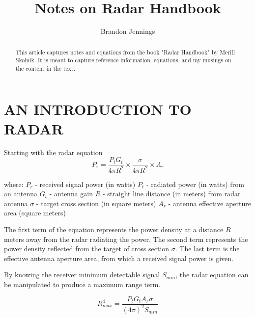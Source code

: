 \documentclass[]{article}
\title{Notes on Radar Handbook}
\author{Brandon Jennings}
\begin{document}
\maketitle

\begin{abstract}
This article captures notes and equations from the book "Radar Handbook" by Merill Skolnik. It is meant to capture reference information, equations, and my musings on the content in the text.
\end{abstract}

\section{AN INTRODUCTION TO RADAR}

Starting with the radar equation
\begin{equation}
P_{r} = \frac{P_{t}G_{t}}{4\pi R^{2}} \times \frac{\sigma}{4\pi R^{2}} \times A_{r}
\end{equation}

\noindent where: \newline
$P_{r}$ - received signal power (in watts) \newline
$P_{t}$ - radiated power (in watts) from an antenna \newline
$G_{t}$ - antenna gain \newline
$R$ - straight line distance (in meters) from radar antenna \newline
$\sigma$ - target cross section (in square meters) \newline
$A_{r}$ - antenna effective aperture area (square meters) \newline

\noindent	The first term of the equation represents the power density at a distance $R$ meters away from the radar radiating the power. The second term represents the power density reflected from the target of cross section $\sigma$. The last term is the effective antenna aperture area, from which a received signal power is given.

\noindent	By knowing the receiver minimum detectable signal $S_{min}$, the radar equation can be manipulated to produce a maximum range term.

\begin{equation}
R^{4}_{max} = \frac{P_{t} G_{t} A_{r} \sigma}{(4\pi)^{2} S_{min}}
\end{equation}
\end{document}
